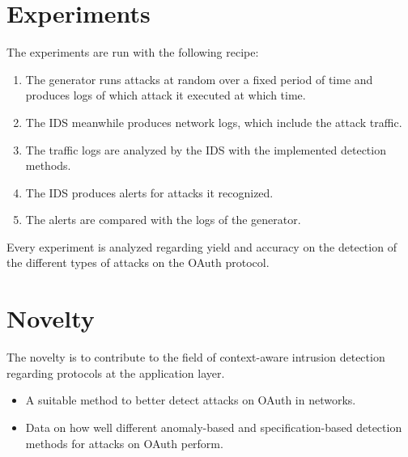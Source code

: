 \documentclass{article}
\begin{document}
\section{Experiments}
The experiments are run with the following recipe:
\begin{enumerate}
\item The generator runs attacks at random over a fixed period of time and produces logs of which attack it executed at which time.
\item The IDS meanwhile produces network logs, which include the attack traffic.
\item The traffic logs are analyzed by the IDS with the implemented detection methods.
\item The IDS produces alerts for attacks it recognized.
\item The alerts are compared with the logs of the generator.
\end{enumerate}
Every experiment is analyzed regarding yield and accuracy on the detection of the different types of attacks on the OAuth protocol.
\section{Novelty}
The novelty is to contribute to the field of context-aware intrusion detection regarding protocols at the application layer.
\begin{itemize}
\item A suitable method to better detect attacks on OAuth in networks.
\item Data on how well different anomaly-based and specification-based detection methods for attacks on OAuth perform.
\end{itemize}


\end{document}
